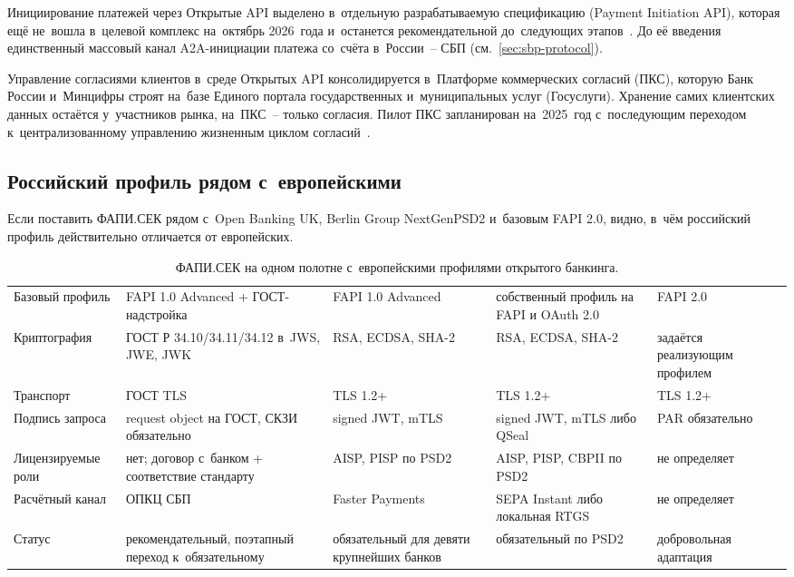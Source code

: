 Инициирование платежей через Открытые API выделено в~отдельную
разрабатываемую спецификацию (Payment Initiation API), которая
ещё не~вошла в~целевой комплекс на~октябрь 2026~года и~останется
рекомендательной до~следующих этапов~\cite{openbankingrussia-wiki}.
До её введения единственный массовый канал A2A-инициации платежа
со~счёта в~России~-- СБП (см.~\ref{sec:sbp-protocol}).

Управление согласиями клиентов в~среде Открытых API
консолидируется в~Платформе коммерческих согласий (ПКС),
которую Банк России и~Минцифры строят на~базе Единого портала
государственных и~муниципальных услуг (Госуслуги). Хранение
самих клиентских данных остаётся у~участников рынка, на~ПКС~--
только согласия. Пилот ПКС запланирован на~2025~год
с~последующим переходом к~централизованному управлению
жизненным циклом согласий~\cite{cbr-open-api-stages-2024,cbr-open-api}.

\subsection*{Российский профиль рядом с~европейскими}

Если поставить ФАПИ.СЕК рядом с~Open Banking UK, Berlin Group
NextGenPSD2 и~базовым FAPI 2.0, видно, в~чём российский профиль
действительно отличается от европейских.

\begin{table}[H]
  \begingroup
  \scriptsize
  \setlength{\tabcolsep}{4pt}
  \renewcommand{\arraystretch}{1.2}
  \begin{tabularx}{\textwidth}{
      @{}B{0.18\textwidth}
      Y
      Y
      Y
      Y@{}
    }
    \toprule
    \headrow
     &  &  &  &  \\
    \midrule
    Базовый профиль & FAPI 1.0 Advanced + ГОСТ-надстройка & FAPI 1.0 Advanced & собственный профиль на FAPI и OAuth 2.0 & FAPI 2.0 \\
    Криптография & ГОСТ Р 34.10/34.11/34.12 в~JWS, JWE, JWK & RSA, ECDSA, SHA-2 & RSA, ECDSA, SHA-2 & задаётся реализующим профилем \\
    Транспорт & ГОСТ TLS & TLS 1.2+ & TLS 1.2+ & TLS 1.2+ \\
    Подпись запроса & request object на ГОСТ, СКЗИ обязательно & signed JWT, mTLS & signed JWT, mTLS либо QSeal & PAR обязательно \\
    Лицензируемые роли & нет; договор с~банком + соответствие стандарту & AISP, PISP по PSD2 & AISP, PISP, CBPII по PSD2 & не определяет \\
    Расчётный канал & ОПКЦ СБП & Faster Payments & SEPA Instant либо локальная RTGS & не определяет \\
    Статус & рекомендательный, поэтапный переход к~обязательному & обязательный для девяти крупнейших банков & обязательный по PSD2 & добровольная адаптация \\
    \bottomrule
  \end{tabularx}%
  \endgroup
  \caption{ФАПИ.СЕК на одном полотне с~европейскими профилями
  открытого банкинга.}\label{tab:fapi-sec-comparison}
\end{table}

